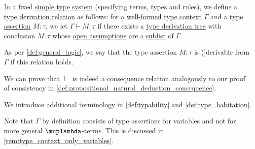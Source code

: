\begin{definition}\label{def:simple_type_derivation}\mimprovised
  In a fixed \hyperref[def:simple_type_system]{simple type system} (specifying terms, types and rules), we define a \hyperref[def:type_derivation_relation]{type derivation relation} as follows: for a \hyperref[rem:well_formed_context]{well-formed} \hyperref[def:type_context]{type context} \( \Gamma \) and a \hyperref[def:type_assertion]{type assertion} \( M: \tau \), we let \( \Gamma \vdash M: \tau \) if there exists a \hyperref[def:type_derivation_tree]{type derivation tree} with conclusion \( M: \tau \) whose \hyperref[def:type_derivation_tree/open_assumptions]{open assumptions} are a \hyperref[def:subsequence]{sublist} of \( \Gamma \).

  As per \cref{def:general_logic}, we say that the type assertion \( M: \tau \) is \term[en=derivable (\cite[def. 3.1.4]{Barendregt1992LambdaCalculiWithTypes})]{derivable} from \( \Gamma \) if this relation holds.
\end{definition}
\begin{defproof}
  We can prove that \( {\vdash} \) is indeed a consequence relation analogously to our proof of consistency in \cref{def:propositional_natural_deduction_consequence}.
\end{defproof}
\begin{comments}
  \item We introduce additional terminology in \cref{def:typability} and \cref{def:type_habitation}.

  \item Note that \( \Gamma \) by definition consists of type assertions for variables and not for more general \( \muplambda \)-terms. This is discussed in \cref{rem:type_context_only_variables}.
\end{comments}


